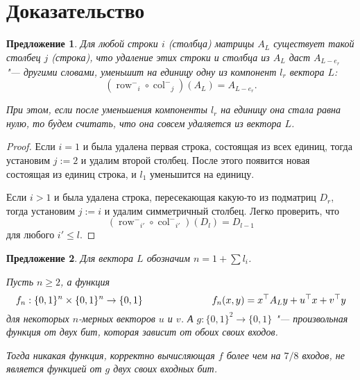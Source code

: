 \documentclass[oneside, a4paper]{article}
\newtheorem{proposition}{Предложение}
\theoremstyle{definition}
\theoremstyle{remark}
\newcommand\rowm{\ensuremath{\operatorname{row}^-}}
\newcommand\colm{\ensuremath{\operatorname{col}^-}}
\begin{document}
\section{Доказательство}

\begin{proposition} \label{easy}
Для любой строки $i$ (столбца) матрицы $A_L$ существует такой столбец $j$
(строка), что удаление этих строки и столбца из $A_L$ даст $A_{L - e_r}$ "---
другими словами, уменьшит на единицу одну из компонент $l_r$ вектора $L$:
\[
(\rowm_i \circ \colm_j)(A_L) = A_{L - e_r}.
\]

При этом, если после уменьшения компоненты $l_r$ на единицу она стала равна нулю,
то будем считать, что она совсем удаляется из вектора $L$.
\end{proposition}
\begin{proof}
Если $i = 1$ и была удалена первая строка, состоящая из всех единиц, тогда
установим $j := 2$ и удалим второй столбец. После этого появится новая состоящая
из единиц строка, и $l_1$ уменьшится на единицу.

Если $i > 1$ и была удалена строка, пересекающая какую-то из подматриц $D_r$,
тогда установим $j := i$ и удалим симметричный столбец. Легко проверить, что
\[
(\rowm_{i'} \circ \colm_{i'})(D_l) = D_{l-1}
\]
для любого $i' \leq l$.
\end{proof}

\begin{proposition} \label{tough}
Для вектора $L$ обозначим $n = 1 + \sum l_i$.

Пусть $n \geq 2$, а функция
\[
f_n : \{0, 1\}^n \times \{0, 1\}^n \to \{0, 1\} \hspace{2.5cm}
f_n(x, y) = x^\top A_L y + u^\top x + v^\top y
\]
для некоторых $n$-мерных векторов $u$ и $v$. А $g : \{0, 1\}^2 \to \{0, 1\}$
"--- произвольная функция от двух бит, которая зависит от обоих своих входов.

Тогда никакая функция, корректно вычисляющая $f$ более чем на $7/8$ входов, не
является функцией от $g$ двух своих входных бит.
\end{proposition}
\end{document}
